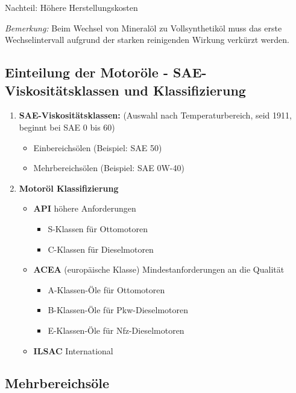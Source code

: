 Nachteil: Höhere Herstellungskosten

\emph{Bemerkung:} Beim Wechsel von Mineralöl zu Vollsynthetiköl muss das
erste Wechselintervall aufgrund der starken reinigenden Wirkung verkürzt
werden.

\subsection{Einteilung der Motoröle - SAE-Viskositätsklassen und
Klassifizierung}\label{einteilung-der-motoroele-sae-viskositaetsklassen-und-klassifizierung}

\begin{enumerate}
\item
  \textbf{SAE-Viskositätsklassen:} (Auswahl nach Temperaturbereich, seid
  1911, beginnt bei SAE 0 bis 60)

  \begin{itemize}
  \item
    Einbereichsölen (Beispiel: SAE 50)
  \item
    Mehrbereichsölen (Beispiel: SAE 0W-40)
  \end{itemize}
\item
  \textbf{Motoröl Klassifizierung}

  \begin{itemize}
  \item
    \textbf{API} höhere Anforderungen

    \begin{itemize}
    \item
      S-Klassen für Ottomotoren
    \item
      C-Klassen für Dieselmotoren
    \end{itemize}
  \item
    \textbf{ACEA} (europäische Klasse) Mindestanforderungen an die
    Qualität

    \begin{itemize}
    \item
      A-Klassen-Öle für Ottomotoren
    \item
      B-Klassen-Öle für Pkw-Dieselmotoren
    \item
      E-Klassen-Öle für Nfz-Dieselmotoren
    \end{itemize}
  \item
    \textbf{ILSAC} International
  \end{itemize}
\end{enumerate}

\subsection{Mehrbereichsöle}\label{mehrbereichsoele}

